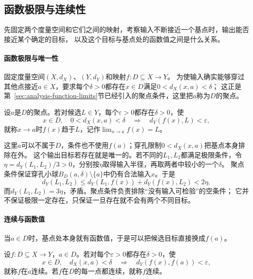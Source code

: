 \subsection{函数极限与连续性}
\label{sec:metric-map-limits}

先固定两个度量空间和它们之间的映射，考察输入不断接近一个基点时，输出能否接近某个确定的目标，
以及这个目标与基点处的函数值之间是什么关系。

\paragraph{函数极限与唯一性}

固定度量空间$(X,d_X)$、$(Y,d_Y)$和映射$f:D\subseteq X\to Y$。
为使输入确实能够穿过其他点接近$a\in X$，要求每个$\delta>0$都存在$x\in D$满足$0<d_X(x,a)<\delta$；
这正是第~\ref{sec:analysis-function-limits}节已经引入的聚点条件，这里把$a$称为$D$的聚点。

\begin{definition}[函数极限]
\label{def:metric-function-limit}
设$a$是$D$的聚点。若对候选$L\in Y$，每个$\varepsilon>0$都存在$\delta>0$，使
\[
  x\in D,\quad 0<d_X(x,a)<\delta
  \quad\Longrightarrow\quad d_Y(f(x),L)<\varepsilon,
\]
就称$x\to a$时$f(x)$趋于$L$，记作$\lim_{x\to a}f(x)=L$。
\end{definition}

这里$a$可以不属于$D$，条件也不使用$f(a)$；穿孔限制$0<d_X(x,a)$把基点本身排除在外。
这个输出目标若存在就是唯一的。若不同的$L_1,L_2$都满足极限条件，令
$\eta=d_Y(L_1,L_2)/3>0$，分别按$\eta$取得输入半径，再取两者中较小的一个$\delta$。
聚点条件保证穿孔小球$B_D(a,\delta)\setminus\{a\}$中仍有合法输入$x$。于是
\[
  d_Y(L_1,L_2)
  \leq d_Y(L_1,f(x))+d_Y(f(x),L_2)<2\eta,
\]
而$d_Y(L_1,L_2)=3\eta$，矛盾。聚点条件负责排除“没有输入可检验”的空条件；
它并不保证极限一定存在，只保证一旦存在就不会有两个不同目标。

\paragraph{连续与函数值}

当$a\in D$时，基点处本身就有函数值，于是可以把候选目标直接换成$f(a)$。

\begin{definition}[连续]
\label{def:metric-continuity-at-point}
设$f:D\subseteq X\to Y$，$a\in D$。若对每个$\varepsilon>0$都存在$\delta>0$，使
\[
  x\in D,\quad d_X(x,a)<\delta
  \quad\Longrightarrow\quad d_Y(f(x),f(a))<\varepsilon,
\]
就称$f$在$a$连续。若$f$在$D$的每一点都连续，就称$f$连续。
\end{definition}

